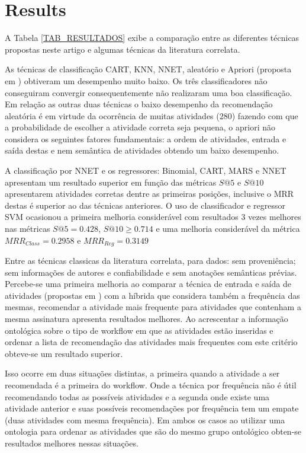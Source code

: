 \documentclass{sig-alternate-05-2015}
\begin{document}
\section{Results}\label{EXPERIMENTOS}
A Tabela \ref{TAB_RESULTADOS} exibe a comparação entre as diferentes técnicas propostas neste artigo e algumas técnicas da literatura correlata.

As técnicas de classificação CART, KNN, NNET, aleatório e Apriori (proposta em \cite{Tan2011, Wang2009}) obtiveram um desempenho muito baixo. Os três classificadores não conseguiram convergir consequentemente não realizaram uma boa classificação. Em relação as outras duas técnicas o baixo desempenho da recomendação aleatória é em virtude da ocorrência de muitas atividades (\(280\)) fazendo com que a probabilidade de escolher a atividade correta seja pequena, o apriori não considera os seguintes fatores fundamentais: a ordem de atividades, entrada e saída destas e nem semântica de atividades obtendo um baixo desempenho.

A classificação por NNET e os regressores: Binomial, CART, MARS e NNET apresentam um resultado superior em função das métricas \(S@5\) e \(S@10\) apresentarem atividades corretas dentre as primeiras posições, inclusive o MRR destas é superior ao das técnicas anteriores. O uso de classificador e regressor SVM ocasionou a primeira melhoria considerável com resultados \(3\) vezes melhores nas métricas \(S@5 = 0.428\), \(S@10 \geq 0.714\) e uma melhoria considerável da métrica \(MRR_{Class} = 0.2958\) e \(MRR_{Reg} = 0.3149\)

Entre as técnicas classicas da literatura correlata, para dados: sem proveniência; sem informações de autores e confiabilidade e sem anotações semânticas prévias. Percebe-se uma primeira melhoria ao comparar a técnica de entrada e saída de atividades (propostas em \cite{TELEA13, VINCA4Science07, Grafo12, diamantini_mining_2012, Zhang2011, Zhang2014}) com a híbrida que considera também a frequência das mesmas, recomendar a atividade mais frequente para atividades que contenham a mesma assinatura apresenta resultados melhores. Ao acrescentar a informação ontológica sobre o tipo de workflow em que as atividades estão inseridas e ordenar a lista de recomendação das atividades mais frequentes com este critério obteve-se um resultado superior.

Isso ocorre em duas situações distintas, a primeira quando a atividade a ser recomendada é a primeira do workflow. Onde a técnica por frequência não é útil recomendando todas as possíveis atividades e a segunda onde existe uma atividade anterior e suas possíveis recomendações por frequência tem um empate (duas atividades com mesma frequência). Em ambos os casos ao utilizar uma ontologia para ordenar as atividades que são do mesmo grupo ontológico obten-se resultados melhores nessas situações.
\end{document}
